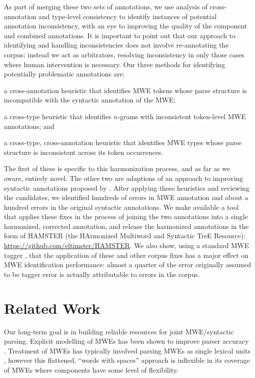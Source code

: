 \documentclass[output=paper
,modfonts
,nonflat]{langsci/langscibook}
\newcommand{\ngram}[1][]{$n$-gram{#1}\xspace}
\begin{document}
As part of merging these two sets of annotations, we use analysis of cross-annotation and type-level consistency to identify instances of potential annotation inconsistency, with an eye to improving the quality of the component and combined annotations. It is important to point out that our approach to identifying and handling inconsistencies does not involve re-annotating the corpus; instead we act as arbitrators, resolving inconsistency in only those cases where human intervention is necessary. Our three methods for identifying potentially problematic annotations are:
\begin{compactitem}
\item a cross-annotation heuristic that identifies MWE tokens whose parse structure is incompatible with the syntactic annotation of the MWE;
\item a cross-type heuristic that identifies \ngram[s] with inconsistent token-level MWE annotations; and
\item a cross-type, cross-annotation heuristic that identifies MWE types whose parse structure is inconsistent across its token occurrences.
\end{compactitem}
The first of these is specific to this harmonization process, and as far as we aware, entirely novel. The other two are adaptions of an approach to improving syntactic annotations proposed by \citet{Dickinson03}. After applying these heuristics and reviewing the candidates, we identified hundreds of errors in MWE annotation and about a hundred errors in the original syntactic annotations. We make available a tool that applies these fixes in the process of joining the two annotations into a single harmonized, corrected annotation, and release the harmonized annotations in the form of HAMSTER (the HArmonized Multiword and Syntactic TreE Resource): \url{https://github.com/eltimster/HAMSTER}. We also show, using a standard MWE tagger \citet{Schneider14b}, that the application of these and other corpus fixes has a major effect on MWE identification performance: almost a quarter of the error originally assumed to be tagger error is actually attributable to errors in the corpus.


\section{Related Work}
\label{sec:relwork}

Our long-term goal is in building reliable resources for joint MWE/syntactic parsing. Explicit modelling of MWEs has been shown to improve parser accuracy \citep{Nivre04,Seretan:Wehrli:2006,Finkel:2009:JPN:1620754.1620802,Korkontzelos:2010:RME:1857999.1858088,Green:2013:PMI:2464100.2464109,Vincze13,Wehrli:2010,Candito14,Constant16}. Treatment of MWEs has typically involved parsing MWEs as single lexical units \citep{Nivre04,Eryigit:2011:MES:2206359.2206365,Fotopoulou14}, however this flattened, ``words with spaces'' \citep{Sag02} approach is inflexible in its coverage of MWEs where components have some level of flexibility.
\end{document}
